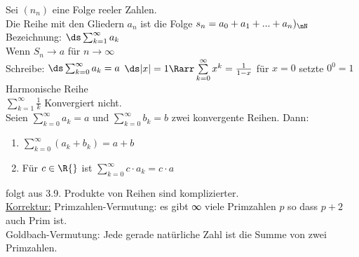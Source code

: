 %
%
Sei $(n_n)$ eine Folge reeler Zahlen.\\
Die Reihe mit den Gliedern $a_n$ ist die Folge $s_n = a_0 + a_1 + ... + a_n)_\nN$ \\
Bezeichnung: $\ds\sum_{k=1}^{\infty} a_k$\\
Wenn $S_n \to a$ für $n \to \infty$\\
Schreibe: $\ds\sum_{k = 0}^{\infty} a_k = a$
$\ds|x| = 1 \Rarr \sum\limits_{k = 0}^{\infty} x^k = \frac{1}{1-x}$ für $x = 0$ setzte $0^0 = 1$\\[4pt]
Harmonische Reihe\\
$\displaystyle\sum\limits_{k = 1}^{\infty} \frac{1}{k}$ Konvergiert nicht.\\
Seien $\sum\limits_{k = 0}^{\infty} a_k = a$ und $\sum\limits_{k = 0}^{\infty} b_k = b$ zwei konvergente Reihen. Dann:
\begin{enumerate}
\item{$\sum\limits_{k = 0}^{\infty} (a_k + b_k) = a + b$}
\item{Für $c \in \R{}$ ist $\sum\limits_{k = 0}^{\infty} c \cdot a_k = c \cdot a$}
\end{enumerate}
\bew
folgt aus 3.9.
\bem
Produkte von Reihen sind komplizierter.\\
\underline{Korrektur:}
Primzahlen-Vermutung: es gibt ∞ viele Primzahlen $p$ so dass $p + 2$ auch Prim ist.\\
Goldbach-Vermutung: Jede gerade natürliche Zahl ist die Summe von zwei Primzahlen.\\
